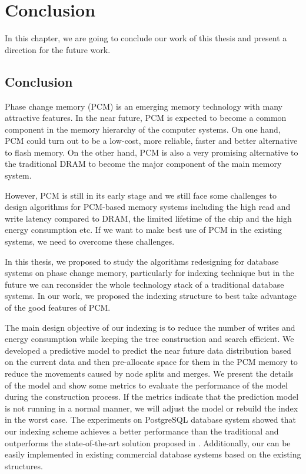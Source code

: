 \chapter{Conclusion}
\label{sec:conclusion}

In this chapter, we are going to conclude our work of this thesis and present a direction for the future work.

\section{Conclusion}

Phase change memory (PCM) is an emerging memory technology with many attractive features. In the near
future, PCM is expected to become a common component in the memory hierarchy of the computer systems.
On one hand, PCM could turn out to be a low-cost, more reliable, faster and better alternative to
flash memory. On the other hand, PCM is also a very promising alternative to the traditional DRAM to
become the major component of the main memory system.

However, PCM is still in its early stage and we still face some challenges to design algorithms for
PCM-based memory systems including the high read and write latency compared to DRAM, the limited lifetime
of the chip and the high energy consumption etc. If we want to make best use of PCM in the existing
systems, we need to overcome these challenges.

In this thesis, we proposed to study the algorithms redesigning for database systems on phase change memory, particularly
for indexing technique but in the future we can reconsider the whole technology stack of a traditional database systems.
In our work, we proposed the \bptree indexing structure to best take advantage of the good features of PCM.

The main design objective of our \bptree indexing is to
reduce the number of writes and energy consumption while keeping
the tree construction and search efficient. We developed a predictive model to
predict the near future data distribution based on the current data and then pre-allocate space for them in the
PCM memory to reduce the movements caused by node splits and merges.
We present the details of the model and show some metrics to
evaluate the performance of the model during the construction process.
If the metrics indicate that the prediction model is not running in a normal manner,
we will adjust the model or rebuild the index in the worst case.
The experiments on PostgreSQL database system showed
that our \bptree indexing scheme achieves a better performance than the traditional \bplustree and outperforms the state-of-the-art solution proposed in
\cite{chen2011rethinking}.
Additionally, our \bptree can be easily implemented in
existing commercial database systems based on the existing \bplustree structures.

